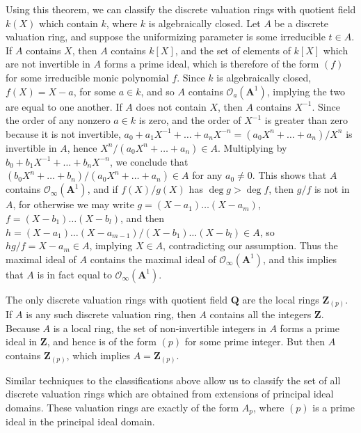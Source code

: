 \begin{example}
    Using this theorem, we can classify the discrete valuation rings with quotient field $k(X)$ which contain $k$, where $k$ is algebraically closed. Let $A$ be a discrete valuation ring, and suppose the uniformizing parameter is some irreducible $t \in A$. If $A$ contains $X$, then $A$ contains $k[X]$, and the set of elements of $k[X]$ which are not invertible in $A$ forms a prime ideal, which is therefore of the form $(f)$ for some irreducible monic polynomial $f$. Since $k$ is algebraically closed, $f(X) = X - a$, for some $a \in k$, and so $A$ contains $\mathcal{O}_a(\mathbf{A}^1)$, implying the two are equal to one another. If $A$ does not contain $X$, then $A$ contains $X^{-1}$. Since the order of any nonzero $a \in k$ is zero, and the order of $X^{-1}$ is greater than zero because it is not invertible, $a_0 + a_1X^{-1} + \dots + a_nX^{-n} = (a_0X^n + \dots + a_n)/X^n$ is invertible in $A$, hence $X^n/(a_0X^n + \dots + a_n) \in A$. Multiplying by $b_0 + b_1X^{-1} + \dots + b_nX^{-n}$, we conclude that $(b_0X^n + \dots + b_n)/(a_0X^n + \dots + a_n) \in A$ for any $a_0 \neq 0$. This shows that $A$ contains $\mathcal{O}_\infty(\mathbf{A}^1)$, and if $f(X)/g(X)$ has $\deg g > \deg f$, then $g/f$ is not in $A$, for otherwise we may write $g = (X-a_1) \dots (X-a_m)$, $f = (X-b_1) \dots (X - b_l)$, and then $h = (X-a_1) \dots (X-a_{m-1})/(X-b_1) \dots (X-b_l) \in A$, so $hg/f = X - a_m \in A$, implying $X \in A$, contradicting our assumption. Thus the maximal ideal of $A$ contains the maximal ideal of $\mathcal{O}_\infty(\mathbf{A}^1)$, and this implies that $A$ is in fact equal to $\mathcal{O}_\infty(\mathbf{A}^1)$.
\end{example}

\begin{example}
    The only discrete valuation rings with quotient field $\mathbf{Q}$ are the local rings $\mathbf{Z}_{(p)}$. If $A$ is any such discrete valuation ring, then $A$ contains all the integers $\mathbf{Z}$. Because $A$ is a local ring, the set of non-invertible integers in $A$ forms a prime ideal in $\mathbf{Z}$, and hence is of the form $(p)$ for some prime integer. But then $A$ contains $\mathbf{Z}_{(p)}$, which implies $A = \mathbf{Z}_{(p)}$.
\end{example}

Similar techniques to the classifications above allow us to classify the set of all discrete valuation rings which are obtained from extensions of principal ideal domains. These valuation rings are exactly of the form $A_p$, where $(p)$ is a prime ideal in the principal ideal domain.




